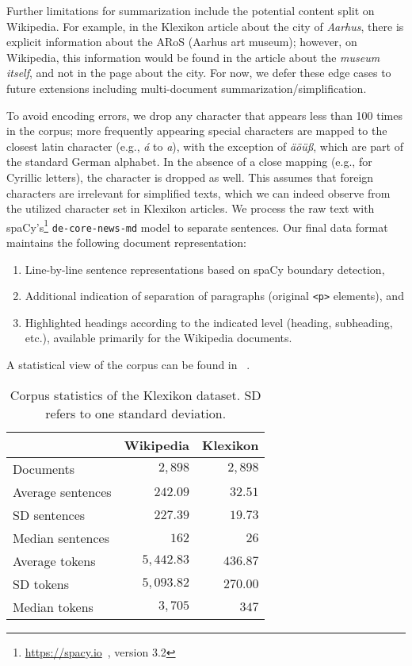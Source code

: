 \documentclass[10pt, a4paper]{article}
\begin{document}
Further limitations for summarization include the potential content split on Wikipedia. For example, in the Klexikon article about the city of \emph{Aarhus}, there is explicit information about the ARoS (Aarhus art museum); however, on Wikipedia, this information would be found in the article about the \emph{museum itself}, and not in the page about the city. For now, we defer these edge cases to future extensions including multi-document summarization/simplification. 

To avoid encoding errors, we drop any character that appears less than 100 times in the corpus; more frequently appearing special characters are mapped to the closest latin character (e.g., \emph{\'{a}} to \emph{a}), with the exception of \emph{äöüß}, which are part of the standard German alphabet. In the absence of a close mapping (e.g., for Cyrillic letters), the character is dropped as well.
This assumes that foreign characters are irrelevant for simplified texts, which we can indeed observe from the utilized character set in Klexikon articles.
We process the raw text with spaCy's\footnote{\url{https://spacy.io}~, version 3.2} \texttt{de-core-news-md} model to separate sentences.
Our final data format maintains the following document representation:
\begin{enumerate}
	\item Line-by-line sentence representations based on spaCy boundary detection,
	\item Additional indication of separation of paragraphs (original \texttt{<p>} elements), and
	\item Highlighted headings according to the indicated level (heading, subheading, etc.), available primarily for the Wikipedia documents.
\end{enumerate}
A statistical view of the corpus can be found in ~.

\begin{table}[t]
	\centering
	\begin{tabular}{lr|r}
		\hline
		\textbf{} & \textbf{Wikipedia} & \textbf{Klexikon} \\
		\hline
		Documents & $2{,}898$ & $2{,}898$ \\
		\hline
		Average sentences & $242.09$ & $32.51$ \\
		SD sentences & $227.39$ & $19.73$ \\
		Median sentences & $162$ & $26$ \\
		\hline
		Average tokens & $5{,}442.83$ & $436.87$ \\
		SD tokens & $5{,}093.82$ & $270.00$ \\
		Median tokens & $3{,}705$ & $347$ \\
		
	\end{tabular}
	\caption{Corpus statistics of the Klexikon dataset. SD refers to one standard deviation.}
	\label{tab:detailed}
\end{table}
\end{document}
